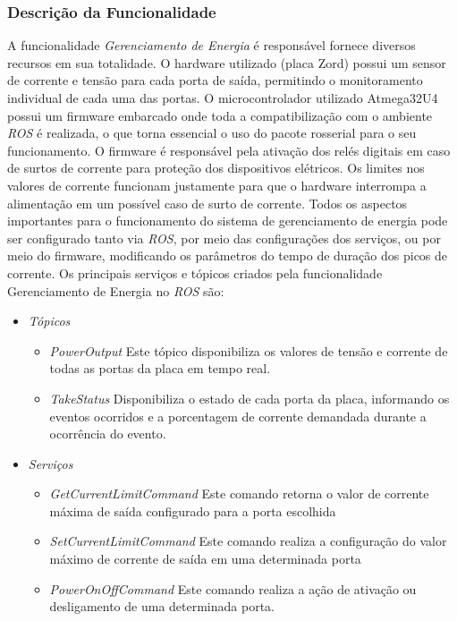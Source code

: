 \subsubsection{Descrição da Funcionalidade}
A funcionalidade \textit{Gerenciamento de Energia} é responsável  fornece diversos recursos em sua totalidade. O hardware utilizado (placa Zord) possui um sensor de corrente e tensão para cada porta de saída, permitindo o monitoramento individual de cada uma das portas. O microcontrolador utilizado Atmega32U4 possui um firmware embarcado onde toda a compatibilização com o ambiente \textit{ROS} é realizada, o que torna essencial o uso do pacote rosserial para o seu funcionamento. O firmware é responsável pela ativação dos relés digitais em caso de surtos de corrente para proteção dos dispositivos elétricos. 
Os limites nos valores de corrente funcionam justamente para que o hardware interrompa a alimentação em um possível caso de surto de corrente. Todos os aspectos importantes para o funcionamento do sistema de gerenciamento de energia pode ser configurado tanto via \textit{ROS}, por meio das configurações dos serviços, ou por meio do firmware, modificando os parâmetros do tempo de duração dos picos de corrente. Os principais serviços e tópicos criados pela funcionalidade Gerenciamento de Energia no \textit{ROS} são:
\begin{itemize}
	\item \textit{Tópicos}
	\begin{itemize}
		\item \textit{PowerOutput}
		Este tópico disponibiliza os valores de tensão e corrente de todas as portas da placa em tempo real.
		\item \textit{TakeStatus}
		Disponibiliza o estado de cada porta da placa, informando os eventos ocorridos e a porcentagem de corrente demandada durante a ocorrência do evento.
	\end{itemize} 
	\item \textit{Serviços} 
	\begin{itemize}
	\item \textit{GetCurrentLimitCommand}
	Este comando retorna o valor de corrente máxima de saída configurado para a porta escolhida
	\item \textit{SetCurrentLimitCommand}
	Este comando realiza a configuração do valor máximo de corrente de saída em uma determinada porta
	\item \textit{PowerOnOffCommand}
	Este comando realiza a ação de ativação ou desligamento de uma determinada porta.
	\end{itemize}
\end{itemize}
